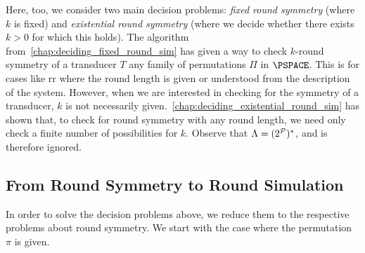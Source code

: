 Here, too, we consider two main decision problems: \emph{fixed round symmetry} (where $k$ is fixed) and \emph{existential round symmetry} (where we decide whether there exists $k>0$ for which this holds). The algorithm from~\cref{chap:deciding_fixed_round_sim} has given a way to check $k$-round symmetry of a transducer $T$ \WRT any family of permutations $\Pi$ in $\PSPACE$. This is for cases like \gls{rr} where the round length is given or understood from the description of the system. However, when we are interested in checking for the symmetry of a transducer, $k$ is not necessarily given.~\cref{chap:deciding_existential_round_sim} has shown that, to check for round symmetry with any round length, we need only check a finite number of possibilities for $k$. Observe that $\Lambda=(2^{\mathcal{P}})^*$, and is therefore ignored.

\subsection*{From Round Symmetry to Round Simulation}
\label{sec:symmetry_to_simulation}
In order to solve the decision problems above, we reduce them to the respective problems about round symmetry. We start with the case where the permutation $\pi$ is given.

